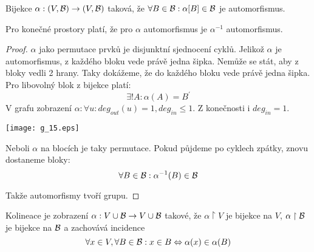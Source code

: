 \begin{definition}[Automorfismus]
    Bijekce $\alpha: (V,\operatorname{\mathcal{B}})\rightarrow (V,\operatorname{\mathcal{B}})$ taková, že $\forall B\in \operatorname{\mathcal{B}}: \alpha[B]\in\operatorname{\mathcal{B}}$ je automorfismus.
\end{definition}

\begin{note}
    Pro konečné prostory platí, že pro $\alpha$ automorfismus je $\alpha^{-1}$ automorfismus.
\end{note}
\begin{proof}
	$\alpha$ jako permutace prvků je disjunktní sjednocení cyklů.
	Jelikož $\alpha$ je automorfismus, z každého bloku vede právě jedna šipka.
	Nemůže se stát, aby z bloky vedli 2 hrany.
	Taky dokážeme, že do každého bloku vede právě jedna šipka.
	Pro libovolný blok z bijekce platí:
	\[ \exists! A: \alpha(A) = B^{\prime} \]
	V grafu zobrazení $\alpha: \forall u: deg_{out}(u) = 1, deg_{in} \leq 1$.
	Z konečnosti i $deg_{in} = 1$.

    	\texttt{[image: g\_15.eps]}

	Neboli $\alpha$ na blocích je taky permutace.
	Pokud půjdeme po cyklech zpátky, znovu dostaneme bloky:
	\[ \forall B \in \operatorname{\mathcal{B}}: \alpha^{-1}(B) \in \operatorname{\mathcal{B}} \]

	Takže automorfismy tvoří grupu.
\end{proof}

\begin{definition}[Kolineace]
    Kolineace je zobrazení $\alpha: V \cup \operatorname{\mathcal{B}} \rightarrow V \cup \operatorname{\mathcal{B}}$ takové, že $\alpha\upharpoonright V$ je bijekce na $V$, $\alpha\upharpoonright \operatorname{\mathcal{B}}$ je bijekce na $\operatorname{\mathcal{B}}$ a zachovává incidence
    \[ \forall x \in V, \forall B \in \operatorname{\mathcal{B}}: x \in B \Leftrightarrow \alpha(x) \in \alpha(B) \]
\end{definition}

